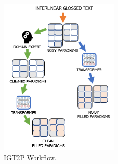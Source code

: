 \begin{figure}[h!]
    \begin{center}
    \includegraphics[width=6cm]{figs/IGT-Paradigm-Workflow.png}
    \caption[IGT2P Workflow]{IGT2P Workflow. 
    }
    \label{fig:IGT2PWorkflow}
    \end{center}
\end{figure}


